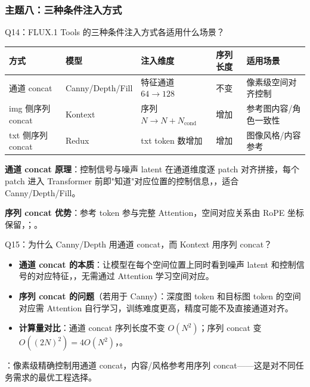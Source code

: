\subsubsection{主题八：三种条件注入方式}

\begin{conceptbox}{Q14：FLUX.1 Tools 的三种条件注入方式各适用什么场景？}
\begin{center}
\small
\begin{tabular}{|l|l|l|l|l|}
\hline
\textbf{方式} & \textbf{模型} & \textbf{注入维度} & \textbf{序列长度} & \textbf{适用场景} \\
\hline
通道 concat & Canny/Depth/Fill & 特征通道 $64\to128$ & 不变 & 像素级空间对齐控制 \\
img 侧序列 concat & Kontext & 序列 $N\to N+N_\text{cond}$ & 增加 & 参考图内容/角色一致性 \\
txt 侧序列 concat & Redux & txt token 数增加 & 增加 & 图像风格/内容参考 \\
\hline
\end{tabular}
\end{center}

\textbf{通道 concat 原理}：控制信号与噪声 latent 在通道维度逐 patch 对齐拼接，每个 patch 进入 Transformer 前即"知道"对应位置的控制信息，，适合 Canny/Depth/Fill。

\textbf{序列 concat 优势}：参考 token 参与完整 Attention，空间对应关系由 RoPE 坐标保留，；。
\end{conceptbox}

\begin{conceptbox}{Q15：为什么 Canny/Depth 用通道 concat，而 Kontext 用序列 concat？}
\begin{itemize}
  \item \textbf{通道 concat 的本质}：让模型在每个空间位置上同时看到噪声 latent 和控制信号的对应特征，，无需通过 Attention 学习空间对应。
  \item \textbf{序列 concat 的问题}（若用于 Canny）：深度图 token 和目标图 token 的空间对应需 Attention 自行学习，训练难度更高，精度可能不及直接通道对齐。
  \item \textbf{计算量对比}：通道 concat 序列长度不变 $O(N^2)$；序列 concat 变 $O((2N)^2) = 4O(N^2)$，。
\end{itemize}

：像素级精确控制用通道 concat，内容/风格参考用序列 concat——这是对不同任务需求的最优工程选择。
\end{conceptbox}


